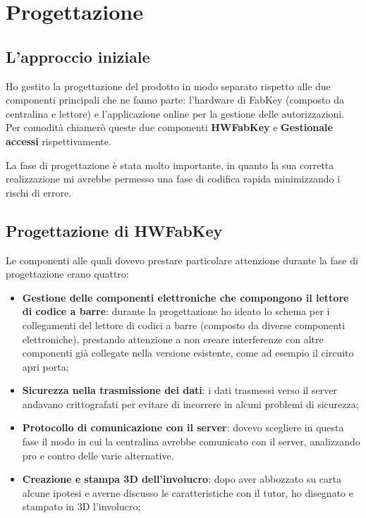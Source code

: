 \section{Progettazione}
\subsection{L'approccio iniziale}
Ho gestito la progettazione del prodotto in modo separato rispetto alle due componenti principali che ne fanno parte: l'hardware di FabKey (composto da centralina e lettore) e l'applicazione online per la gestione delle autorizzazioni. Per comodità chiamerò queste due componenti \textbf{HWFabKey} e \textbf{Gestionale accessi} rispettivamente.

\medskip

La fase di progettazione è stata molto importante, in quanto la sua corretta realizzazione mi avrebbe permesso una fase di codifica rapida minimizzando i rischi di errore.

\bigskip

\subsection{Progettazione di HWFabKey}

Le componenti alle quali dovevo prestare particolare attenzione durante la fase di progettazione erano quattro:
\begin{itemize}
\item \textbf{Gestione delle componenti elettroniche che compongono il lettore di codice a barre}: durante la progettazione ho ideato lo schema per i collegamenti del lettore di codici a barre (composto da diverse componenti elettroniche), prestando attenzione a non creare interferenze con altre componenti già collegate nella versione esistente, come ad esempio il circuito apri porta;
\item \textbf{Sicurezza nella trasmissione dei dati}: i dati trasmessi verso il server andavano crittografati per evitare di incorrere in alcuni problemi di sicurezza;
\item \textbf{Protocollo di comunicazione con il server}: dovevo scegliere in questa fase il modo in cui la centralina avrebbe comunicato con il server, analizzando pro e contro delle varie alternative.
\item \textbf{Creazione e stampa 3D dell'involucro}: dopo aver abbozzato su carta alcune ipotesi e averne discusso le caratteristiche con il tutor, ho disegnato e stampato in 3D l'involucro;
\end{itemize}

